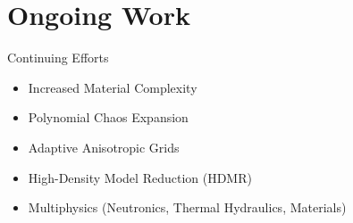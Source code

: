 \documentclass{beamer}
\begin{document}
\section{Ongoing Work}
\begin{frame}{Continuing Efforts}\vspace{-30pt}
\begin{itemize}
\item Increased Material Complexity\vspace{10pt}
\item Polynomial Chaos Expansion\vspace{10pt}
\item Adaptive  Anisotropic Grids\vspace{10pt}
\item High-Density Model Reduction (HDMR)\vspace{10pt}
\item Multiphysics (Neutronics, Thermal Hydraulics, Materials)
\end{itemize}
\end{frame}

\section{}
\begin{frame}{}

\end{frame}

%
\end{document}
